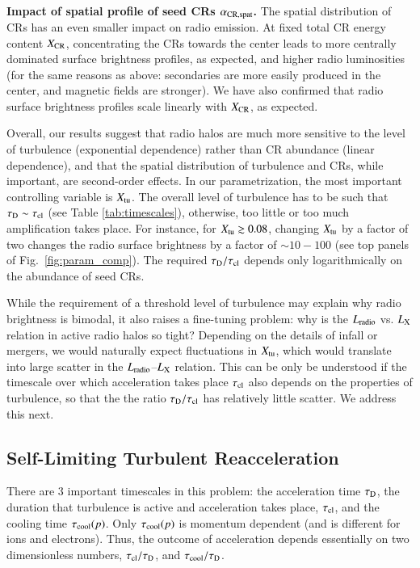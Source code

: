 \documentclass[fleqn,usenatbib,useAMS]{mnras}
\begin{document}
{\bf Impact of spatial profile of seed CRs $\alpha_{\rm CR, spat}$.} The spatial distribution of CRs has an even smaller impact on radio emission. At fixed total CR energy content $X_{\rm CR}$, concentrating the CRs towards the center leads to more centrally dominated surface brightness profiles, as expected, and higher radio luminosities (for the same reasons as above: secondaries are more easily produced in the center, and magnetic fields are stronger). We have also confirmed that radio surface brightness profiles scale linearly with $X_{\rm CR}$, as expected. 

Overall, our results suggest that radio halos are much more sensitive to the level of turbulence (exponential dependence) rather than CR abundance (linear dependence), and that the spatial distribution of turbulence and CRs, while important, are second-order effects. In our parametrization, the most important controlling variable is $X_{\rm tu}$. The overall level of turbulence has to be such that $\tau_{\rm D} \sim \tau_{\rm cl}$ (see Table \ref{tab:timescales}), otherwise, too little or too much amplification takes place. For instance, for $X_{\mathrm{tu}}\gtrsim0.08$, changing $X_{\mathrm{tu}}$ by a factor of two changes the radio surface brightness by a factor of $\sim 10-100$ (see top panels of Fig.~\ref{fig:param_comp}). The required $\tau_{\rm D}/\tau_{\rm cl}$ depends only logarithmically on the abundance of seed CRs.

While the requirement of a threshold level of turbulence may explain why radio brightness is bimodal, it also raises a fine-tuning problem: why is the $L_{\rm radio}$ vs. $L_{\rm X}$ relation in active radio halos so tight? Depending on the details of infall or mergers, we would naturally expect fluctuations in $X_{\rm tu}$, which would translate into large scatter in the $L_{\rm radio}$--$L_{\rm X}$ relation. This can be only be understood if the timescale over which acceleration takes place $\tau_{\rm cl}$ also depends on the properties of turbulence, so that the the ratio $\tau_{\rm D}/\tau_{\rm cl}$ has relatively little scatter. We address this next. %

\subsection{Self-Limiting Turbulent Reacceleration}

There are 3 important timescales in this problem: the acceleration time $\tau_{\rm D}$, the duration that turbulence is active and acceleration takes place, $\tau_{\rm cl}$, and the cooling time $\tau_{\rm cool}(p)$. Only $\tau_{\rm cool}(p)$ is momentum dependent (and is different for ions and electrons). Thus, the outcome of acceleration depends essentially on two dimensionless numbers, $\tau_{\rm cl}/\tau_{\rm D}$, and $\tau_{\rm cool}/\tau_{\rm D}$. 
\end{document}
